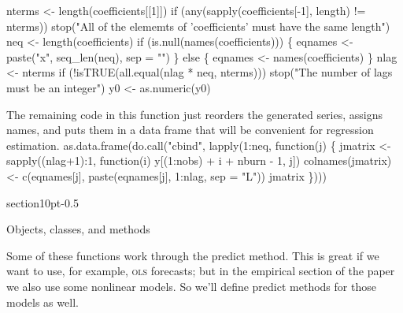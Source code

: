 \documentclass[10pt]{article}%
\makeatletter
\renewcommand\section{\@startsection%
{section}{1}{0pt}{-\baselineskip}{0.5\baselineskip}%
{\normalfont\normalsize\bfseries\large\raggedright}}
\makeatother
\begin{document}
nterms <- length(coefficients[[1]])
if (any(sapply(coefficients[-1], length) != nterms))
  stop("All of the elememts of 'coefficients' must have the same length")
neq <- length(coefficients)
if (is.null(names(coefficients))) \{
  eqnames <- paste("x", seq_len(neq), sep = "") 
\} else \{
  eqnames <- names(coefficients)
\}
nlag <- nterms %
if (!isTRUE(all.equal(nlag * neq, nterms))) 
  stop("The number of lags must be an integer")
y0 <- as.numeric(y0)
\nwendcode{}\nwdocspar

The remaining code in this function just reorders the generated
series, assigns names, and puts them in a data frame that will be
convenient for regression estimation.
\nwenddocs{}\endmoddef\nwstartdeflinemarkup{}\nwenddeflinemarkup
as.data.frame(do.call("cbind", lapply(1:neq, function(j) \{
    jmatrix <- sapply((nlag+1):1, function(i) y[(1:nobs) + i + nburn - 1, j])
    colnames(jmatrix) <- c(eqnames[j], paste(eqnames[j], 1:nlag, sep = "L"))
    jmatrix
  \})))
\nwendcode{}\nwdocspar

\section{Objects, classes, and methods}

Some of these functions work through the {\Tt{}predict\nwendquote} method.  This is
great if we want to use, for example, \textsc{ols} forecasts; but in
the empirical section of the paper we also use some nonlinear models.
So we'll define {\Tt{}predict\nwendquote} methods for those models as well.
\end{document}
